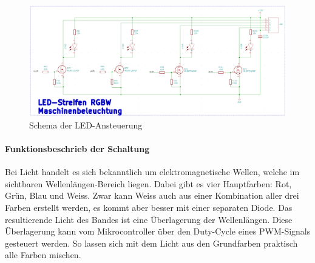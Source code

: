 \begin{figure}[!h]
\center
\includegraphics[width =  \textwidth]{graphics/Schema_LED}
\caption{Schema der LED-Ansteuerung}
\label{fig:Schema_LED}
\end{figure}
\newpage
\paragraph{Funktionsbeschrieb der Schaltung}\mbox{}

Bei Licht handelt es sich bekanntlich um elektromagnetische Wellen, welche im sichtbaren Wellenlängen-Bereich liegen. Dabei gibt es vier Hauptfarben: Rot, Grün, Blau und Weiss. Zwar kann Weiss auch aus einer Kombination aller drei Farben erstellt werden, es kommt aber besser mit einer separaten Diode. Das resultierende Licht des Bandes ist eine Überlagerung der Wellenlängen. Diese Überlagerung kann vom Mikrocontroller über den Duty-Cycle eines PWM-Signals gesteuert werden. So lassen sich mit dem Licht aus den Grundfarben praktisch alle Farben mischen.